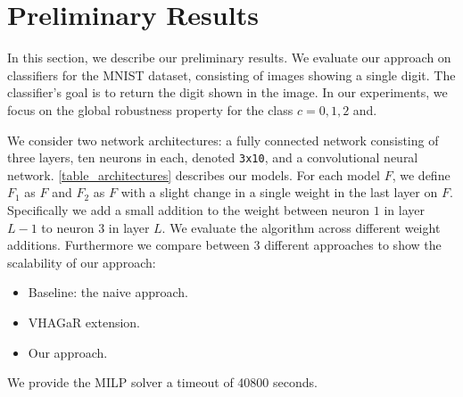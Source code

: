 
\section{Preliminary Results}
In this section, we describe our preliminary results.
We evaluate our approach on classifiers for the MNIST dataset, consisting of images showing a single digit.
The classifier's goal is to return the digit shown in the image. In our experiments, we focus on the global robustness property for the class $c=0,1,2$ and.

We consider two network architectures: 
a fully connected network consisting of three layers, ten neurons in each, denoted \texttt{3x10}, and a convolutional neural network. 
\ref{table_architectures} describes our models. For each model $F$, we define $F_1$ as $F$ and $F_2$ as $F$ with a slight change in a single weight in the last layer on $F$. Specifically we add a small addition to the weight between neuron $1$ in layer $L-1$ to neuron $3$ in layer $L$. We evaluate the algorithm across different weight additions. 
Furthermore we compare between 3 different approaches to show the scalability of our approach:
\begin{itemize}
    \item Baseline: the naive approach.
    \item VHAGaR extension.
    \item Our approach.
\end{itemize} 
We provide the MILP solver a timeout of 40800 seconds.

\begin{table}[H]
    \centering
    \caption{The networks used for this experience.
        \label{table_architectures}}
\end{table}

